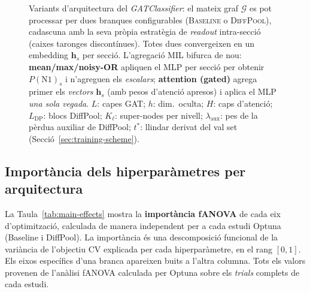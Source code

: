\documentclass[10pt,a4paper,twocolumn,twoside]{article}
\begin{document}
\begin{figure}[H]
\begin{tikzpicture}
\end{tikzpicture}
\caption{Variants d'arquitectura del \textit{GATClassifier}: el mateix graf
$\mathcal{G}$ es pot processar per dues branques configurables
(\textsc{Baseline} o \textsc{DiffPool}), cadascuna amb la seva pròpia
estratègia de \textit{readout} intra-secció (caixes taronges discontínues).
Totes dues convergeixen en un embedding $\mathbf{h}_s$ per secció.
L'agregació MIL bifurca de nou: \textbf{mean/max/noisy-OR} apliquen el MLP
per secció per obtenir $P(\text{N1})_s$ i n'agreguen els \emph{escalars};
\textbf{attention (gated)} agrega primer els \emph{vectors} $\mathbf{h}_s$
(amb pesos d'atenció apresos) i aplica el MLP \emph{una sola vegada}.
$L$: capes GAT; $h$: dim.\ oculta; $H$: caps d'atenció;
$L_{\text{DP}}$: blocs DiffPool; $K_\ell$: super-nodes per nivell;
$\lambda_{\text{aux}}$: pes de la pèrdua auxiliar de DiffPool;
$t^*$: llindar derivat del val set (Secció~\ref{sec:training-scheme}).}
\label{fig:gat-variants}
\end{figure}

\newpage

\subsection{Importància dels hiperparàmetres per arquitectura}
\label{app:main-effects}

La Taula~\ref{tab:main-effects} mostra la \textbf{importància fANOVA} de cada eix
d'optimització, calculada de manera independent per a cada estudi Optuna (Baseline i
DiffPool). La importància és una descomposició funcional de la variància de l'objectiu CV
explicada per cada hiperparàmetre, en el rang $[0, 1]$. Els eixos específics d'una branca
apareixen buits a l'altra columna. Tots els valors provenen de l'anàlisi fANOVA calculada per Optuna sobre els \textit{trials} complets de cada estudi.
\end{document}

